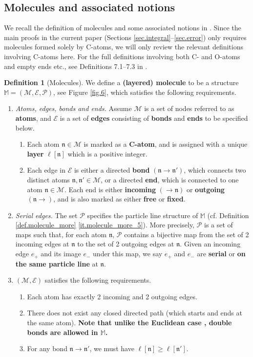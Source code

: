 \documentclass[10pt, reqno]{amsart}
\newcommand{\newterm}[1]{{\textbf{#1}}}
\newcommand{\Mb}{\mathbb M}
\newcommand{\Ec}{\mathcal E}
\renewcommand{\Mc}{\mathcal M}
\newcommand{\Pc}{\mathcal P}
\newcommand{\nf}{\mathfrak n}
\theoremstyle{definition}
\newtheorem{definition}[theorem]{Definition}
\theoremstyle{remark}
\numberwithin{equation}{section}
\begin{document}
\subsection{Molecules and associated notions}\label{sec.recall_mol} We recall the definition of molecules and some associated notions in \cite{DHM24}. Since the main proofs in the current paper (Sections \ref{sec.integral}--\ref{sec.error}) only requires molecules formed solely by C-atoms, we will only review the relevant definitions involving C-atoms here. For the full definitions involving both C- and O-atoms and empty ends etc., see Definitions 7.1--7.3 in \cite{DHM24}.
\begin{definition}[Molecules]
\label{def.molecule}
We define a \newterm{(layered) molecule} to be a structure $\Mb=(\Mc,\Ec,\Pc)$, see Figure \ref{fig.6}, which satisfies the following requirements.
\begin{enumerate}
    \item \textit{Atoms, edges, bonds and ends.} Assume $\Mc$ is a set of nodes referred to as \newterm{atoms}, and $\Ec$ is a set of \newterm{edges} consisting of \newterm{bonds} and \newterm{ends} to be specified below.
    \begin{enumerate}
        \item Each atom $\nf\in \Mc$ is marked as a \newterm{C-atom}, and is assigned with a unique \newterm{layer} $\ell[\nf]$ which is a positive integer.
        \item\label{it.molecule_edge} Each edge in $\Ec$ is either a directed \newterm{bond} $(\nf\to \nf')$, which connects two distinct atoms $\nf,\nf'\in\Mc$, or a directed \newterm{end}, which is connected to one atom $\nf\in\Mc$. Each end is either \newterm{incoming} $(\to \nf)$ or \newterm{outgoing} $(\nf\to)$, and is also marked as either \newterm{free} or \newterm{fixed}.
    \end{enumerate}
        \item\label{it.particle_line_same} \textit{Serial edges.}  The set $\Pc$ specifies the particle line structure of $\Mb$ (cf. Definition \ref{def.molecule_more} \eqref{it.molecule_more_5}). More precisely, $\Pc$ is a set of maps such that, for each atom $\nf$, $\Pc$ contains a bijective map from the set of 2 incoming edges at $\nf$ to the set of 2 outgoing edges at $\nf$. Given an incoming edge $e_+$ and its image $e_-$ under this map, we say $e_+$ and $e_-$ are \newterm{serial} or \newterm{on the same particle line} at $\nf$.
    \item $(\Mc, \Ec)$ satisfies the following requirements.
    \begin{enumerate}
        \item Each atom has exactly 2 incoming and 2 outgoing edges. 
        \item There does not exist any closed directed path (which starts and ends at the same atom). \textbf{Note that unlike the Euclidean case \cite{DHM24}, double bonds are allowed in $\Mb$.}
        \item For any bond $\nf\to\nf'$, we must have $\ell[\nf]\geq\ell[\nf']$.
    \end{enumerate}
\end{enumerate}
\end{definition}
\end{document}
